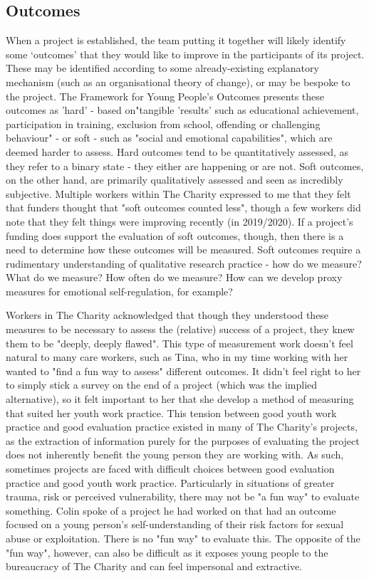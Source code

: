 \subsection{Outcomes}
\label{subsec:6-3-1-outcomes}
When a project is established, the team putting it together will likely identify some ‘outcomes’ that they would like to improve in the participants of its project. These may be identified according to some already-existing explanatory mechanism (such as an organisational theory of change), or may be bespoke to the project. The Framework for Young People's Outcomes \citep{mcneil_framework_2012} presents these outcomes as 'hard' - based on"tangible 'results' such as educational achievement, participation in training, exclusion from school, offending or challenging behaviour" - or soft - such as "social and emotional capabilities", which are deemed harder to assess. Hard outcomes tend to be quantitatively assessed, as they refer to a binary state - they either are happening or are not. Soft outcomes, on the other hand, are primarily qualitatively assessed and seen as incredibly subjective. Multiple workers within The Charity expressed to me that they felt that funders thought that "soft outcomes counted less", though a few workers did note that they felt things were improving recently (in 2019/2020). If a project's funding does support the evaluation of soft outcomes, though, then there is a need to determine how these outcomes will be measured. Soft outcomes require a rudimentary understanding of qualitative research practice - how do we measure? What do we measure? How often do we measure? How can we develop proxy measures for emotional self-regulation, for example? 

Workers in The Charity acknowledged that though they understood these measures to be necessary to assess the (relative) success of a project, they knew them to be "deeply, deeply flawed". This type of measurement work doesn't feel natural to many care workers, such as Tina, who in my time working with her wanted to "find a fun way to assess" different outcomes. It didn't feel right to her to simply stick a survey on the end of a project (which was the implied alternative), so it felt important to her that she develop a method of measuring that suited her youth work practice. This tension between good youth work practice and good evaluation practice existed in many of The Charity's projects, as the extraction of information purely for the purposes of evaluating the project does not inherently benefit the young person they are working with. As such, sometimes projects are faced with difficult choices between good evaluation practice and good youth work practice. Particularly in situations of greater trauma, risk or perceived vulnerability, there may not be "a fun way" to evaluate something. Colin spoke of a project he had worked on that had an outcome focused on a young person's self-understanding of their risk factors for sexual abuse or exploitation. There is no "fun way" to evaluate this. The opposite of the "fun way", however, can also be difficult as it exposes young people to the bureaucracy of The Charity and can feel impersonal and extractive. 


